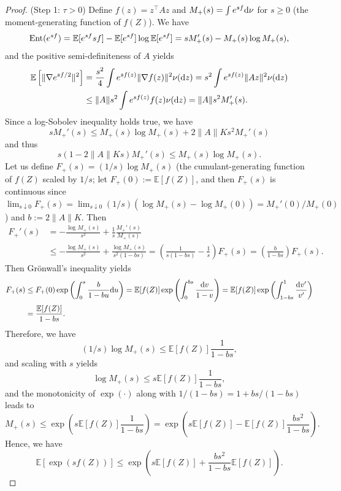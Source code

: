 \documentclass[11pt,a4paper]{article}
\theoremstyle{remark}
\theoremstyle{definition}
\newcommand{\bZ}{Z}
\newcommand{\bz}{z}
\newcommand{\bfA}{A}
\newcommand{\E}{\mathbb{E}}
\newcommand{\diff}{\textnormal{d}}
\newcommand{\Ent}{\textnormal{Ent}}
\theoremstyle{definition}
\begin{document}
\begin{bibunit}[apalike]
\begin{proof}
(Step 1: $\tau>0$)
Define $f(\bz)=\bz^{\top}\bfA\bz$ and $M_{+}(s)=\int e^{sf}\diff\nu$ for $s\ge0$ (the moment-generating function of $f(\bZ)$).
We have
\begin{equation*}
    \Ent( e^{sf})=\E[ e^{sf}sf]-\E[e^{sf}]\log\E[e^{sf}]=sM_{+}'(s)-M_{+}(s)\log M_{+}(s),
\end{equation*}
and the positive semi-definiteness of $\bfA$ yields
\begin{align*}
    \E\left[\|\nabla e^{sf/2}\|^{2}\right]&=\frac{s^{2}}{4}\int e^{sf(\bz)}\|\nabla f(\bz)\|^{2}\nu(\diff\bz)= s^{2}\int e^{sf(\bz)}\|\bfA\bz\|^{2}\nu(\diff\bz)\\
    &\le \|\bfA\|s^{2}\int e^{sf(\bz)}f(\bz)\nu(\diff\bz)= \|\bfA\|s^{2}M_{+}'(s).
\end{align*}
Since a log-Sobolev inequality holds true, we have
\begin{equation*}
    sM_{+}'(s)\le M_{+}(s)\log M_{+} (s)  +2\|\bfA\|Ks^{2}M_{+}'(s)
\end{equation*}
and thus 
\begin{equation*}
    s(1-2\|\bfA\|Ks)M_{+}'(s)\le M_{+}(s)\log M_{+}(s).
\end{equation*}
Let us define $F_{+}(s)=(1/s)\log M_{+}(s)$ (the cumulant-generating function of $f(\bZ)$ scaled by $1/s$; let $F_{+}(0):=\E[f(\bZ)]$, and then $F_{+}(s)$ is continuous since $\lim_{s\downarrow0}F_{+}(s)=\lim_{s\downarrow0}(1/s)(\log M_{+}(s)-\log M_{+}(0))=M_{+}'(0)/M_{+}(0)$) and $b:=2\|\bfA\|K$.
Then
\begin{align*}
    F_{+}'(s)&=-\frac{\log M_{+}(s)}{s^{2}}+\frac{1}{s}\frac{M_{+}'(s)}{M_{+}(s)}\\
    &\le -\frac{\log M_{+}(s)}{s^{2}}+\frac{\log M_{+}(s)}{s^{2}(1-bs)}=\left(\frac{1}{s(1-bs)}-\frac{1}{s}\right)F_{+}(s)=\left(\frac{b}{1-bs}\right)F_{+}(s).
\end{align*}
Then Gr\"{o}nwall's inequality yields
\begin{align*}
    F_{+}(s)&\le F_{+}(0)\exp\left(\int_{0}^{s}\frac{b}{1-bu}\diff u\right)=\E[f(\bZ)]\exp\left(\int_{0}^{bs}\frac{\diff v}{1-v}\right)=\E[f(\bZ)]\exp\left(\int_{1-bs}^{1}\frac{\diff v'}{v'}\right)\\
    &=\frac{\E[f(\bZ)]}{1-bs}.
\end{align*}
Therefore, we have
\begin{equation*}
    (1/s)\log M_{+}(s)\le \E[f(\bZ)]\frac{1}{1-bs},
\end{equation*}
and scaling with $s$ yields
\begin{equation*}
    \log M_{+}(s)\le s\E[f(\bZ)]\frac{1}{1-bs},
\end{equation*}
and the monotonicity of $\exp(\cdot)$ along with $1/(1-bs)=1+bs/(1-bs)$ leads to
\begin{equation*}
    M_{+}(s)\le \exp\left(s\E[f(\bZ)]\frac{1}{1-bs}\right)=\exp\left(s\E[f(\bZ)]-\E[f(\bZ)]\frac{bs^{2}}{1-bs}\right).
\end{equation*}
Hence, we have
\begin{equation*}
    \E[\exp(sf(\bZ))]\le \exp\left(s\E[f(\bZ)]+\frac{bs^{2}}{1-bs}\E[f(\bZ)]\right).
\end{equation*}


\end{proof}
\end{bibunit}
\end{document}
